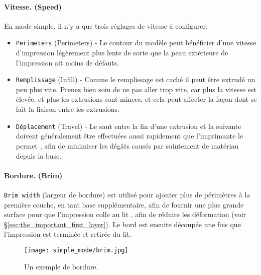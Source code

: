 \paragraph{Vitesse. (Speed)} %
\label{par:simple_speed}
En mode simple, il n'y a que trois réglages de vitesse à configurer:
\begin{itemize}
	\item \texttt{Perimeters} (Perimeters) - Le contour du modèle peut bénéficier d'une vitesse d'impression légèrement plus lente de sorte que la peau extérieure de l'impression ait moins de défauts.
	\item \texttt{Remplissage} (Infill) - Comme le remplissage est caché il peut être extrudé un peu plus vite. Prenez bien soin de ne pas aller trop vite, car plus la vitesse est élevée, et plus les extrusions sont minces, et cela peut affecter la façon dont se fait la liaison entre les extrusions.
	\item \texttt{Déplacement} (Travel) - Le saut entre la fin d'une extrusion et la suivante doivent généralement être effectuées aussi rapidement que l'imprimante le permet , afin de minimiser les dégâts causés par suintement de matériau depuis la buse.
\end{itemize}

\paragraph{Bordure. (Brim)} %
\label{par:simple_brim}
\texttt{Brim width} (largeur de bordure) est utilisé pour ajouter plus de périmètres à la première couche, en tant base supplémentaire, afin de fournir une plus grande surface pour que l'impression colle au lit , afin de réduire les déformation (voir §\ref{sec:the_important_first_layer}). Le bord est ensuite découpée une fois que l'impression est terminée et retirée du lit.

\begin{figure}[H]
\centering
\texttt{[image: simple\_mode/brim.jpg]}
\caption{Un exemple de bordure.}
\label{fig:an_example_of_brim}
\end{figure}

